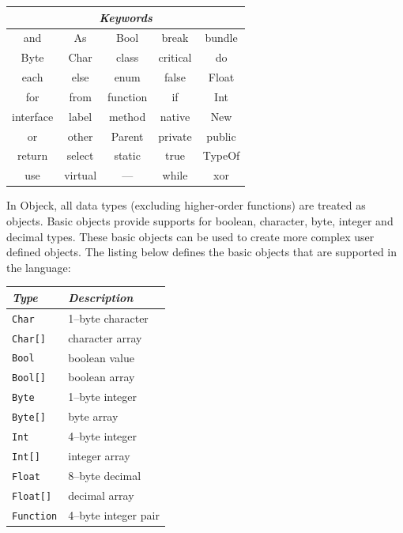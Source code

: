 \documentclass[11pt]{article}
\begin{document}
\begin{center}
  \begin{tabular}{ | c | c | c | c | c | }
    \hline
    \multicolumn{5}{|c|}{\emph{Keywords}} \\ \hline \hline
    and & As & Bool & break & bundle \\ \hline
    Byte & Char & class & critical & do \\ \hline
    each & else & enum & false & Float \\ \hline
    for & from & function & if & Int \\ \hline
    interface & label & method & native & New \\ \hline
    or & other & Parent & private & public \\ \hline
    return & select & static & true & TypeOf \\ \hline
    use & virtual & --- & while & xor \\ \hline
  \end{tabular}
\end{center}

In Objeck, all data types (excluding higher-order functions) are
treated as objects. Basic objects provide supports for boolean,
character, byte, integer and decimal types.  These basic objects can
be used to create more complex user defined objects.  The listing
below defines the basic objects that are supported in the language:

\begin{center}
  \begin{tabular}{| l | l |}
    \hline
    \emph{Type} & \emph{Description} \\ \hline \hline
    \texttt{Char} &  1--byte character \\ \hline
    \texttt{Char[]} &  character array \\ \hline
    \texttt{Bool} &  boolean value \\ \hline
    \texttt{Bool[]} &  boolean array \\ \hline
    \texttt{Byte} &  1--byte integer \\ \hline
    \texttt{Byte[]} &  byte array \\ \hline
    \texttt{Int} &  4--byte integer \\ \hline
    \texttt{Int[]} &  integer array \\ \hline
    \texttt{Float} &  8--byte decimal \\ \hline
    \texttt{Float[]} &  decimal array \\ \hline
    \texttt{Function} &  4--byte integer pair \\ \hline
  \end{tabular}
\end{center}
\end{document}

